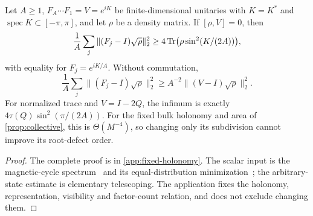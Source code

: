 \begin{holonomyproposition}\label{prop:fixed-holonomy}
Let $A\ge1$, $F_A\cdots F_1=V=e^{iK}$ be finite-dimensional unitaries with $K=K^*$ and $\operatorname{spec}K\subset[-\pi,\pi]$, and let $\rho$ be a density matrix. If $[\rho,V]=0$, then
\[
 \frac1A\sum_j\|(F_j-I)\sqrt\rho\|_2^2\ge4\operatorname{Tr}\bigl(\rho\sin^2(K/(2A))\bigr),
\]
with equality for $F_j=e^{iK/A}$. Without commutation,
\[
 \frac1A\sum_j\|(F_j-I)\sqrt\rho\|_2^2\ge A^{-2}\|(V-I)\sqrt\rho\|_2^2.
\]
For normalized trace and $V=I-2Q$, the infimum is exactly $4\tau(Q)\sin^2(\pi/(2A))$. For the fixed bulk holonomy and area of \cref{prop:collective}, this is $\Theta(M^{-4})$, so changing only its subdivision cannot improve its root-defect order.
\end{holonomyproposition}
\begin{proof}
The complete proof is in \cref{app:fixed-holonomy}. The scalar input is the magnetic-cycle spectrum~\cite[Lemma~2.9]{CTT11} and its equal-distribution minimization~\cite[Proposition~4.6(b)]{BGKLM20}; the arbitrary-state estimate is elementary telescoping. The application fixes the holonomy, representation, visibility and factor-count relation, and does not exclude changing them.
\end{proof}
